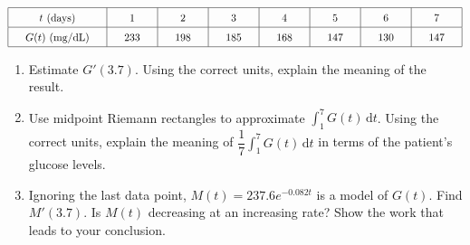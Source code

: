  \begin{align*}
    \arraycolsep=16.5pt\def\arraystretch{1.5}
    \begin{array}{|c|c|c|c|c|c|c|c|}
        \hline
        t \text{ (days)} & 1 & 2 & 3 & 4 & 5 & 6 & 7 \\ \hline
        G(t) \text{ (mg/dL)} & 233 & 198 & 185 & 168 & 147 & 130 & 147 \\
        \hline 
    \end{array}
\end{align*}
\begin{enumerate}[label=\hspace{11pt}(\alph*), align=left, leftmargin=*, labelsep=0.25em]
    \item Estimate $G'(3.7)$. Using the correct units, explain the meaning of the result.
    \item Use midpoint Riemann rectangles to approximate $\int_1^7 G(t) \,\mathrm{d}t$. Using the correct units, explain the meaning of $\dfrac{1}{7}\int_1^7 G(t) \,\mathrm{d}t$ in terms of the patient's glucose levels.
    \item Ignoring the last data point, $M(t) = 237.6e^{-0.082t}$ is a model of $G(t)$. Find $M'(3.7)$. Is $M(t)$ decreasing at an increasing rate? Show the work that leads to your conclusion.
\end{enumerate} \vspace{11pt}

